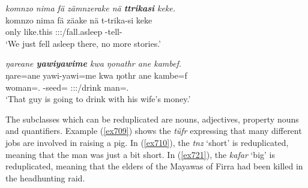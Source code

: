 \begin{exe}
	\ex \emph{komnzo nima fä zämnzerake nä \textbf{ttrikasi} keke.}\\
	\gll komnzo nima fä zäake nä t-trika-si keke\\
	only {like.this} \Dist{} \Fnsg:\Sbj:\Pst:\Pfv/fall.asleep \Indf{} \Redup-tell-\Nmlz{} \Neg{}\\
	\trans `We just fell asleep there, no more stories.'
	\label{ex707}
\end{exe}
\begin{exe}
	\ex \emph{ŋareane \textbf{yawiyawime} kwa ŋonathr ane kambef.}\\
	\gll ŋare=ane yawi-yawi=me kwa ŋothr ane kambe=f\\
	woman=\Poss.\Sg{} \Redup-seed=\Ins{} \Fut{} \Stsg:\Sbj:\Nonpast:\Ipfv/drink \Dem{} man=\Erg.\Sg{}\\
	\trans `That guy is going to drink with his wife's money.'
	\label{ex708}
\end{exe}

The  subclasses which can be reduplicated are nouns, adjectives, property nouns and quantifiers. Example (\ref{ex709}) shows the  \emph{tüfr} expressing that many different jobs are involved in raising a pig. In (\ref{ex710}), the  \emph{tnz} `short' is reduplicated, meaning that the man was just a bit short. In (\ref{ex721}), the  \emph{kafar} `big' is reduplicated, meaning that the elders of the Mayawas of Firra had been killed in the headhunting raid.

